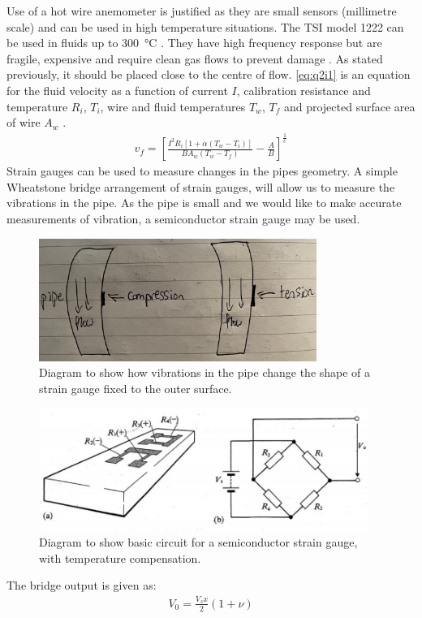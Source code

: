 \documentclass[11pt]{article}
\numberwithin{equation}{section}
\begin{document}
Use of a hot wire anemometer is justified as they are small sensors (millimetre scale) and can be used in high temperature situations. The TSI model 1222 can be used in fluids up to \SI{300}{\celsius} \cite{b3}. They have high frequency response but are fragile, expensive and require clean gas flows to prevent damage \cite{b3}. As stated previously, it should be placed close to the centre of flow. \ref{eq:q2i1} is an equation for the fluid velocity as a function of current $I$, calibration resistance and temperature $R_i$, $T_i$, wire and fluid temperatures $T_w$, $T_f$ and projected surface area of wire $A_w$ \cite{b2}.
\begin{align}
    v_f = \left[\frac{I^2 R_{i}\left[1 + \alpha \left(T_w - T_i\right)\right]}{BA_w \left(T_w - T_f\right)}-\frac{A}{B}\right]^{\frac{1}{c}} \label{eq:q2i1}
\end{align}
Strain gauges can be used to measure changes in the pipes geometry. A simple Wheatstone bridge arrangement of strain gauges, will allow us to measure the vibrations in the pipe. As the pipe is small and we would like to make accurate measurements of vibration, a semiconductor strain gauge may be used. 
\begin{figure}[H]
    \centering
    \includegraphics[height = 4cm]{./img/q2i3.jpg}
    \caption{Diagram to show how vibrations in the pipe change the shape of a strain gauge fixed to the outer surface.} 
    \label{fig:q2i3}
\end{figure}
\begin{figure}[H]
    \centering
    \includegraphics[height = 4cm]{./img/q2i2.png}
    \caption{Diagram to show basic circuit for a semiconductor strain gauge, with temperature compensation.} 
    \label{fig:q2i2}
\end{figure}
The bridge output is given as:
\begin{align}
    V_0 = \frac{V_s x }{2} \left(1 + \nu\right)
\end{align}
\end{document}
